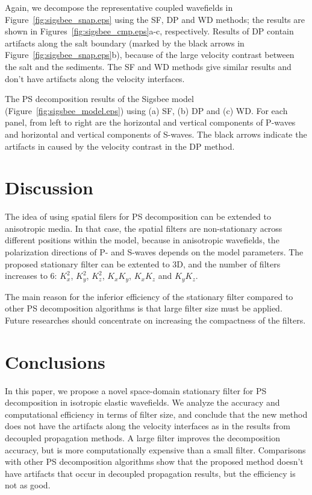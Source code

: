 \documentclass[manuscript,ulem,graphix,revised]{geophysics}
\begin{document}
Again, we decompose the representative coupled wavefields in Figure~\ref{fig:sigsbee_snap.eps} using the SF, DP and WD methods; the results are shown in Figures~\ref{fig:sigsbee_cmp.eps}a-c, respectively. Results of DP contain artifacts along the salt boundary (marked by the black arrows in Figure~\ref{fig:sigsbee_snap.eps}b), because of the large velocity contrast between the salt and the sediments. The SF and WD methods give similar results and don't have artifacts along the velocity interfaces. 

{
The PS decomposition results of the Sigsbee model (Figure~\ref{fig:sigsbee_model.eps}) using (a) SF, (b) DP and (c) WD. For each panel, from left to right are the horizontal and vertical components of P-waves and horizontal and vertical components of S-waves. The black arrows indicate the artifacts in caused by the velocity contrast in the DP method.
}


\section{Discussion}
\indent\indent
The idea of using spatial filers for PS decomposition can be extended to anisotropic media. In that case, the spatial filters are non-stationary across different positions within the model, because in anisotropic wavefields, the polarization directions of P- and S-waves depends on the model parameters.
The proposed stationary filter can be extented to 3D, and the number of filters increases to 6: $K^2_{x}$, $K^2_{y}$, $K^2_{z}$, $K_xK_y$, $K_xK_z$ and $K_yK_z$.

The main reason for the inferior efficiency of the stationary filter compared to other PS decomposition algorithms is that large filter size must be applied. Future researches should concentrate on increasing the compactness of the filters. 


\section{Conclusions}

In this paper, we propose a novel space-domain stationary filter for PS decomposition in isotropic elastic wavefields. We analyze the accuracy and computational efficiency in terms of filter size, and conclude that the new method does not have the artifacts along the velocity interfaces as in the results from decoupled propagation methods. A large filter improves the decomposition accuracy, but is more computationally expensive than a small filter. Comparisons with other PS decomposition algorithms show that the proposed method doesn't have artifacts that occur in decoupled propagation results, but the efficiency is not as good. 
\end{document}
